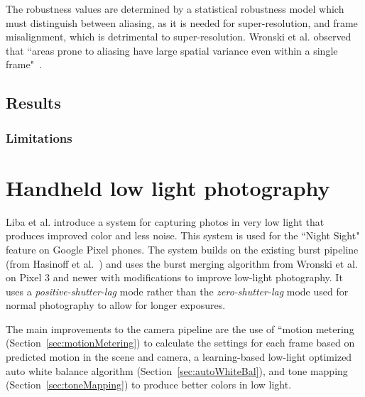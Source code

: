\documentclass{sig-alternate}
\begin{document}
The robustness values are determined by a statistical robustness model which must distinguish between aliasing, as it is needed for super-resolution, and frame misalignment, which is detrimental to super-resolution. Wronski et al. observed that ``areas prone to aliasing have large spatial variance even within a single frame"~\cite{Wronski2019}.



\subsection{Results}


\subsubsection{Limitations}

\section{Handheld low light photography}
\label{sec:handheldLowLight}

Liba et al. \cite{Liba2019} introduce a system for capturing photos in very low light that produces improved color and less noise. This system is used for the ``Night Sight" feature on Google Pixel phones.
The system builds on the existing burst pipeline (from Hasinoff et al.~\cite{Hasinoff2016}) and uses the burst merging algorithm from Wronski et al.~\cite{Wronski2019} on Pixel 3 and newer with modifications to improve low-light photography. It uses a \emph{positive-shutter-lag} mode rather than the \emph{zero-shutter-lag} mode used for normal photography to allow for longer exposures.

The main improvements to the camera pipeline are the use of ``motion metering (Section~\ref{sec:motionMetering}) to calculate the settings for each frame based on predicted motion in the scene and camera, a learning-based low-light optimized auto white balance algorithm (Section~\ref{sec:autoWhiteBal}), and tone mapping (Section~\ref{sec:toneMapping}) to produce better colors in low light.

\end{document}

